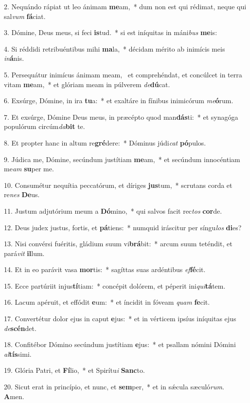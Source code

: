 2. Nequándo rápiat ut leo ánimam \textbf{me}am,~*  dum non est qui rédimat, neque qui sal\textit{vum} \textbf{fá}ciat.\

3. Dómine, Deus meus, si feci \textbf{is}tud.~*  si est iníquitas in máni\textit{bus} \textbf{me}is:\

4. Si réddidi retribuéntibus mihi \textbf{ma}la,~*  décidam mérito ab inimícis meis \textit{in}\textbf{á}nis.\

5. Persequátur inimícus ánimam meam, \dag\  et comprehéndat, et concúlcet in terra vitam \textbf{me}am,~*  et glóriam meam in púlverem \textit{de}\textbf{dú}cat.\

6. Exsúrge, Dómine, in ira \textbf{tu}a:~*  et exaltáre in fínibus inimicórum \textit{me}\textbf{ó}rum.\

7. Et exsúrge, Dómine Deus meus, in præcépto quod man\textbf{dás}ti:~*  et synagóga populórum circúm\textit{da}\textbf{bit} te.\

8. Et propter hanc in altum re\textbf{gré}dere:~*  Dóminus júdi\textit{cat} \textbf{pó}pulos.\

9. Júdica me, Dómine, secúndum justítiam \textbf{me}am,~*  et secúndum innocéntiam me\textit{am} \textbf{su}per me.\

10. Consumétur nequítia peccatórum, et díriges \textbf{jus}tum,~*  scrutans corda et re\textit{nes} \textbf{De}us.\

11. Justum adjutórium meum a \textbf{Dó}mino,~*  qui salvos facit rec\textit{tos} \textbf{cor}de.\

12. Deus judex justus, fortis, et \textbf{pá}tiens:~*  numquid iráscitur per síngu\textit{los} \textbf{di}es?\

13. Nisi convérsi fuéritis, gládium suum vi\textbf{brá}bit:~*  arcum suum teténdit, et pará\textit{vit} \textbf{il}lum.\

14. Et in eo parávit vasa \textbf{mor}tis:~*  sagíttas suas ardéntibus \textit{ef}\textbf{fé}cit.\

15. Ecce partúriit injus\textbf{tí}tiam:~*  concépit dolórem, et péperit ini\textit{qui}\textbf{tá}tem.\

16. Lacum apéruit, et effódit \textbf{e}um:~*  et íncidit in fóveam \textit{quam} \textbf{fe}cit.\

17. Convertétur dolor ejus in caput \textbf{e}jus:~*  et in vérticem ipsíus iníquitas ejus \textit{de}\textbf{scén}det.\

18. Confitébor Dómino secúndum justítiam \textbf{e}jus:~*  et psallam nómini Dómini \textit{al}\textbf{tís}simi.\

19. Glória Patri, et \textbf{Fí}lio,~*  et Spirítu\textit{i} \textbf{Sanc}to.\

20. Sicut erat in princípio, et nunc, et \textbf{sem}per,~*  et in sǽcula sæculó\textit{rum}. \textbf{A}men.\

